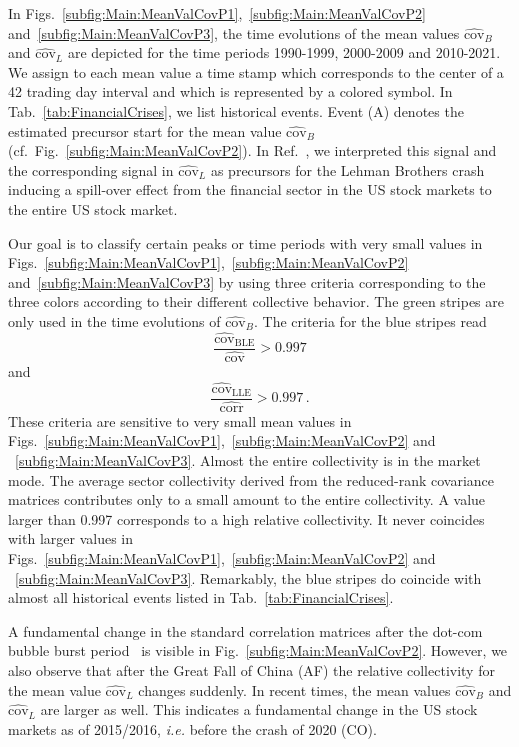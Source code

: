 \documentclass[aps, pra, groupedaddress, showkeys, twocolumn, floatfix, 10pt]{revtex4-2}
\newcommand*\meanNONDiag[1]{\widehat{#1}}
\begin{document}
In Figs.~\ref{subfig:Main:MeanValCovP1},~\ref{subfig:Main:MeanValCovP2} and~\ref{subfig:Main:MeanValCovP3}, the time evolutions of the mean values $\meanNONDiag{\text{cov}}_{{B}}$ and $\meanNONDiag{\text{cov}}_{{L}}$ are depicted for the time periods 1990-1999, 2000-2009 and 2010-2021.
We assign to each mean value a time stamp which corresponds to
the center of a 42 trading day interval and which is represented by a colored symbol.
In Tab.~\ref{tab:FinancialCrises}, we list historical events.
Event (A) denotes the estimated precursor start for the mean value 
$\meanNONDiag{\text{cov}}_{{B}}$ (cf.~Fig.~\ref{subfig:Main:MeanValCovP2}).
In Ref.~\cite{Heckens_2022}, we interpreted this signal and the corresponding signal in $\meanNONDiag{\text{cov}}_{{L}}$ as precursors for the Lehman Brothers crash inducing a spill-over effect from the financial sector in the US stock markets to the entire US stock market.


Our goal is to classify certain peaks or time periods with very small values 
in Figs.~\ref{subfig:Main:MeanValCovP1},~\ref{subfig:Main:MeanValCovP2} and~\ref{subfig:Main:MeanValCovP3}
by using three criteria corresponding to the three colors according to their different collective behavior.
The green stripes are only used in the time evolutions of $\meanNONDiag{\text{cov}}_{{B}}$.
The criteria for the blue stripes read
\begin{equation} \label{eqn:CovCollCondHigh}
	\frac{\meanNONDiag{\text{cov}}_{\text{BLE}}}{\meanNONDiag{\text{cov}}} > 0.997
\end{equation}
%
and
\begin{equation} \label{eqn:CorrCollCondHigh}
	\frac{\meanNONDiag{\text{cov}}_{\text{LLE}}}{\meanNONDiag{\text{corr}}} > 0.997 \,.
\end{equation}
These criteria are sensitive to very small mean values in Figs.~\ref{subfig:Main:MeanValCovP1},~\ref{subfig:Main:MeanValCovP2} and ~\ref{subfig:Main:MeanValCovP3}. Almost the entire collectivity is in the market mode.
The average sector collectivity derived from the reduced-rank covariance matrices  contributes only to a small amount to the entire collectivity.
A value larger than 0.997 corresponds to a high relative collectivity.
It never coincides with larger values in Figs.~\ref{subfig:Main:MeanValCovP1},~\ref{subfig:Main:MeanValCovP2} and ~\ref{subfig:Main:MeanValCovP3}. 
Remarkably, the blue stripes do coincide with almost all historical events listed in Tab.~\ref{tab:FinancialCrises}.

A fundamental change in the standard correlation matrices after the dot-com bubble burst period~\cite{kenett2011index,raddant2016phase,Raddant_2017,Pharasi_2018} is visible in Fig.~\ref{subfig:Main:MeanValCovP2}. 
However, we also observe that after the Great Fall of China (AF) the relative collectivity for the mean value $\meanNONDiag{\text{cov}}_{{L}}$ changes suddenly. In recent times, the mean values $\meanNONDiag{\text{cov}}_{{B}}$ and $\meanNONDiag{\text{cov}}_{{L}}$ are larger as well.
This indicates a fundamental change in the US stock markets as of 2015/2016, \textit{i.e.} before the crash of 2020 (CO).
\end{document}
